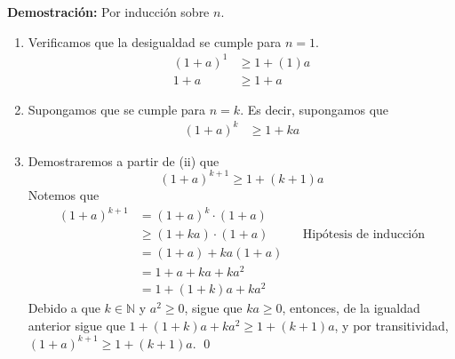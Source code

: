 \documentclass[11pt]{article}
\newcommand{\N}{\mathbb{N}}
\begin{document}
\begin{enumerate}
 \textbf{Demostración:} Por inducción sobre $n$. \begin{enumerate}[label=\roman*)]
  \item Verificamos que la desigualdad se cumple para $n=1$. \begin{align*}
   (1+a)^1 &\geq 1+(1)a\\
   1+a &\geq 1+a
  \end{align*}
  \item Supongamos que se cumple para $n=k$. Es decir, supongamos que \begin{align*}
   (1+a)^k &\geq 1+ ka
  \end{align*}
  \item Demostraremos a partir de (ii) que \[(1+a)^{k+1}\geq 1 + (k+1)a\]
  Notemos que \begin{align*}
   (1+a)^{k+1} &= (1+a)^k \cdot (1+a)\\
   &\geq (1+ka) \cdot (1+a) && \text{Hipótesis de inducción}\\
   &= (1+a)+ka(1+a)\\
   &= 1+a+ka+ka^2\\
   &= 1+(1+k)a+ka^2
  \end{align*} Debido a que $k\in \N$ y $a^2 \geq 0$, sigue que $ka\geq 0$, entonces, de la igualdad anterior sigue que $1+(1+k)a+ka^2 \geq 1+ (k+1)a$, y por transitividad, $(1+a)^{k+1} \geq 1+ (k+1)a$. \qed
 \end{enumerate}


\end{enumerate}
\end{document}
